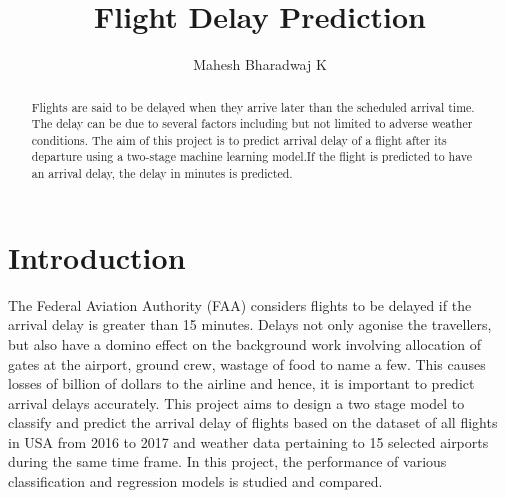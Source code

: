 \documentclass[12pt]{extarticle}
\title{\textbf{Flight Delay Prediction}}
\author{Mahesh Bharadwaj K}
\date{}
\begin{document}
\maketitle
\begin{abstract}
    Flights are said to be delayed when they arrive later than the scheduled arrival time. The delay can be due to several factors including but not limited to adverse weather conditions. The aim of this project is to predict arrival delay of a flight after its departure using a two-stage machine learning model.If the flight is predicted to have an arrival delay, the delay in minutes is predicted.
\end{abstract}
\vfill
\section{Introduction}
The Federal Aviation Authority (FAA) considers flights to be delayed if the arrival delay is greater than 15 minutes. Delays not only agonise the travellers, but also have a domino effect on the background work involving allocation of gates at the airport, ground crew, wastage of food to name a few. This causes losses of billion of dollars to the airline and hence, it is important to predict arrival delays accurately. This project aims to design a two stage model to classify and predict the arrival delay of flights based on the dataset of all flights in USA from 2016 to 2017 and weather data pertaining to 15 selected airports during the same time frame. In this project, the performance of various classification and regression models is studied and compared.
\vfill

\newpage
\end{document}
